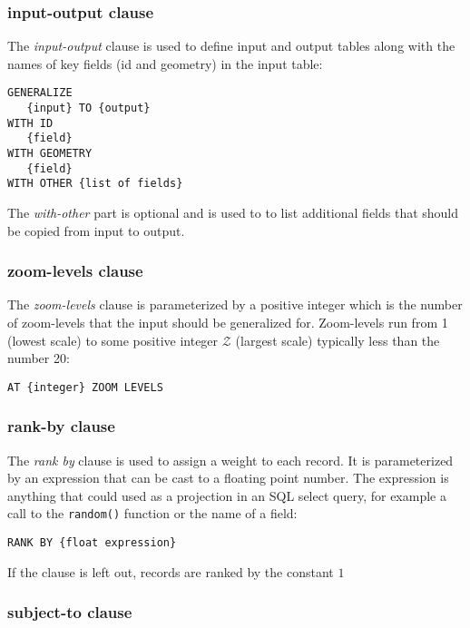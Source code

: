 \subsubsection{input-output clause}

The \emph{input-output} clause is used to define input and output tables along with the names of key fields (id and geometry) in the input table:

\begin{lstlisting}
GENERALIZE 
   {input} TO {output}
WITH ID
   {field}
WITH GEOMETRY 
   {field}
WITH OTHER {list of fields}
\end{lstlisting}

The \emph{with-other} part is optional and is used to to list additional fields that should be copied from input to output.

\subsubsection{zoom-levels clause}

The \emph{zoom-levels} clause is parameterized by a positive integer which is the number of zoom-levels that the input should be generalized for. Zoom-levels run from 1 (lowest scale) to some positive integer $\mathcal{Z}$ (largest scale) typically less than the number 20:

\begin{lstlisting}
AT {integer} ZOOM LEVELS
\end{lstlisting}

\subsubsection{rank-by clause}

The \emph{rank by} clause is used to assign a weight to each record. It is parameterized by an expression that can be cast to a floating point number. The expression is anything that could used as a projection in an SQL select query, for example a call to the \texttt{random()} function or the name of a field:

\begin{lstlisting}
RANK BY {float expression}
\end{lstlisting}

If the clause is left out, records are ranked by the constant $1$

\subsubsection{subject-to clause}

